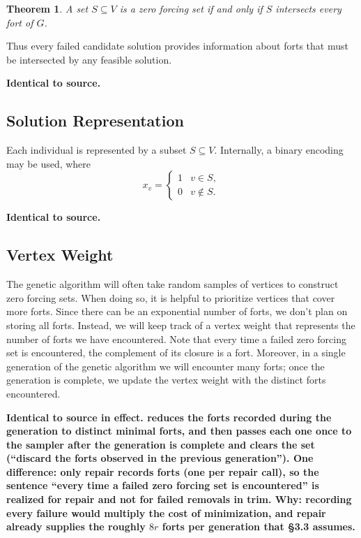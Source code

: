 \documentclass[11pt]{article}
\newtheorem{theorem}{Theorem}
\newenvironment{diff}{\par\medskip\noindent\begingroup\color{red}\bfseries\boldmath}{\par\endgroup\medskip}
\newcommand{\code}[1]{{\mdseries\ttfamily\detokenize{#1}}}
\begin{document}
\begin{theorem}
A set $S \subseteq V$ is a zero forcing set if and only if
$S$ intersects every fort of $G$.
\end{theorem}

Thus every failed candidate solution provides information about
forts that must be intersected by any feasible solution.
\begin{diff}
Identical to source.
\end{diff}


\subsection{Solution Representation}
Each individual is represented by a subset $S \subseteq V$.
Internally, a binary encoding may be used, where
\[
x_v =
\begin{cases}
1 & v \in S,\\
0 & v \notin S.
\end{cases}
\]
\begin{diff}
Identical to source.
\end{diff}


\subsection{Vertex Weight}
The genetic algorithm will often take random samples of vertices to construct zero forcing sets.
When doing so, it is helpful to prioritize vertices that cover more forts.
Since there can be an exponential number of forts, we don't plan on storing all forts.
Instead, we will keep track of a vertex weight that represents the number of forts we have encountered.
Note that every time a failed zero forcing set is encountered, the complement of its closure is a fort. 
Moreover, in a single generation of the genetic algorithm we will encounter many forts; once the generation is complete, we update the vertex weight with the distinct forts encountered. 
\begin{diff}
Identical to source in effect. \code{trim_all_forts} reduces the forts recorded during the generation to distinct minimal forts, and \code{acknowledge_all_forts} then passes each one once to the sampler after the generation is complete and clears the set (``discard the forts observed in the previous generation''). One difference: only repair records forts (one per repair call), so the sentence ``every time a failed zero forcing set is encountered'' is realized for repair and not for failed removals in trim. Why: recording every failure would multiply the cost of minimization, and repair already supplies the roughly $8r$ forts per generation that \S3.3 assumes.
\end{diff}
\end{document}
